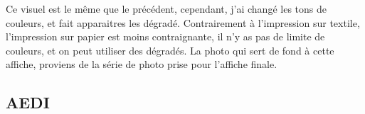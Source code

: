             \begin{center}    
                Ce visuel est le même que le précédent, cependant, j'ai changé les tons de couleurs, et fait apparaitres les dégradé. Contrairement à l'impression sur textile, l'impression sur papier est moins contraignante, il n'y as pas de limite de couleurs, et on peut utiliser des dégradés.
                La photo qui sert de fond à cette affiche, proviens de la série de photo prise pour l'affiche finale.
            \end{center}
            
    \subsection{AEDI}
            
